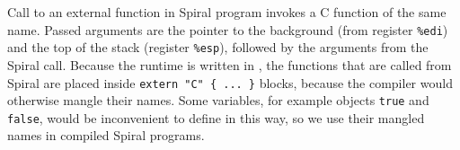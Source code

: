 Call to an external function in Spiral program invokes a C function of the
same name. Passed arguments are the pointer to the background (from register
\texttt{\%edi}) and the top of the stack (register \texttt{\%esp}), followed by
the arguments from the Spiral call. Because the runtime is written in
\Cplusplus{}, the functions that are called from Spiral are placed inside
\texttt{extern "C"~\{ ... \}} blocks, because the \Cplusplus{} compiler would
otherwise mangle their names. Some variables, for example objects \texttt{true}
and \texttt{false}, would be inconvenient to define in this way, so we use their
mangled names in compiled Spiral programs.
